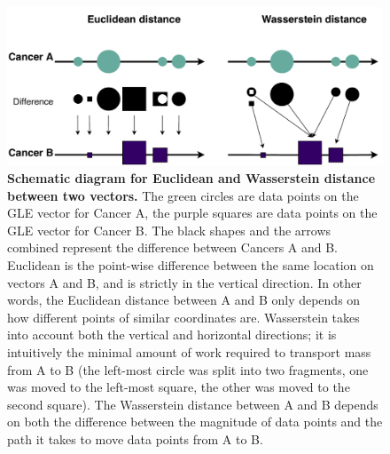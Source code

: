 \begin{figure}[ht!]
    \centering
    \includegraphics[scale=0.8]{graphics/wasserstein_demo.pdf}
    \caption{\textbf{Schematic diagram for Euclidean and Wasserstein distance between two vectors.} The green circles are data points on the GLE vector for Cancer A, the purple squares are data points on the GLE vector for Cancer B. The black shapes and the arrows combined represent the difference between Cancers A and B. Euclidean is the point-wise difference between the same location on vectors A and B, and is strictly in the vertical direction. In other words, the Euclidean distance between A and B only depends on how different points of similar coordinates are. Wasserstein takes into account both the vertical and horizontal directions; it is intuitively the minimal amount of work required to transport mass from A to B (the left-most circle was split into two fragments, one was moved to the left-most square, the other was moved to the second square). The Wasserstein distance between A and B depends on both the difference between the magnitude of data points and the path it takes to move data points from A to B.}
    \label{fig:wasserstein_demo}
\end{figure}
